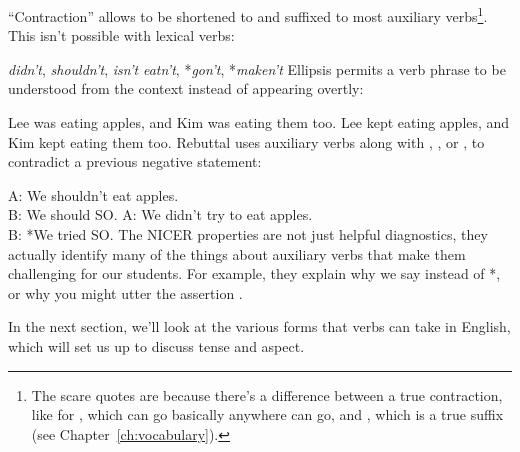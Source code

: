``Contraction'' allows  to be shortened to  and suffixed to most auxiliary verbs\footnote{The scare quotes are because there's a difference between a true contraction, like  for , which can go basically anywhere  can go, and , which is a true suffix (see Chapter~\ref{ch:vocabulary}).}. This isn't possible with lexical verbs:

\ea \emph{didn't}, \emph{shouldn't}, \emph{isn't}
\ex *\emph{eatn't}, *\emph{gon't}, *\emph{maken't}
\z
Ellipsis permits a verb phrase to be understood from the context instead of appearing overtly:

\ea Lee was eating apples, and Kim was {\op}eating them{\cp} too.
\ex *Lee kept eating apples, and Kim kept {\op}eating them{\cp} too.
\z
Rebuttal uses auxiliary verbs along with , , or , to contradict a previous negative statement:

\ea A: We shouldn't eat apples.\\
B: We should SO.
\ex A: We didn't try to eat apples.
\\ B: *We tried SO.
\z
The NICER properties are not just helpful diagnostics, they actually identify many of the things about auxiliary verbs that make them challenging for our students. For example, they explain why we say  instead of *, or why you might utter the assertion .



In the next section, we'll look at the various forms that verbs can take in English, which will set us up to discuss tense and aspect.

